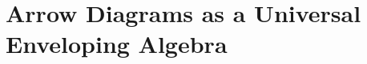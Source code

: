 \chapter{Arrow Diagrams as a Universal Enveloping Algebra}
\label{ch:arrow-diagrams-as-a-universal-enveloping-algebra}
